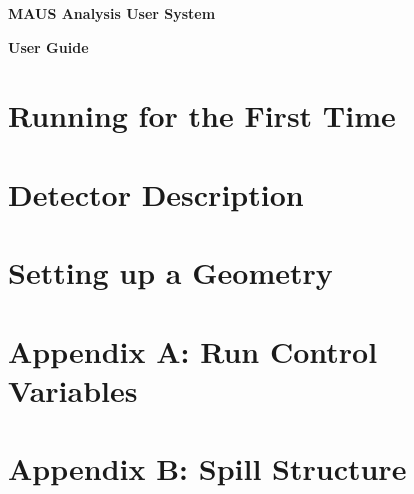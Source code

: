 \documentclass[a4paper, 10pt] {report}
\begin{document}
\vspace*{2.0cm}

\begin{center}
\Large{ \bf{MAUS Analysis User System} }

\Large{ \bf{User Guide} }
\end{center}

\chapter{Running for the First Time}


\chapter{Detector Description}






\chapter{Setting up a Geometry}


\chapter{Appendix A: Run Control Variables}

\chapter{Appendix B: Spill Structure}
\end{document}
